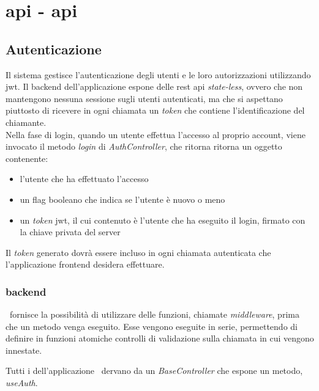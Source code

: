 \chapter{\acrshort{api} - \acrlong{api}}

\section{Autenticazione}
\label{chap:api}

Il sistema gestisce l'autenticazione degli utenti e le loro autorizzazioni utilizzando \gls{jwt}. Il \gls{backend} dell'applicazione espone delle \acrshort{rest} \acrshort{api} \textit{state-less}, ovvero che non mantengono nessuna sessione sugli utenti autenticati, ma che si aspettano piuttosto di ricevere in ogni chiamata un \textit{token} che contiene l'identificazione del chiamante. \\

\noindent
Nella fase di login, quando un utente effettua l'accesso al proprio account, viene invocato il metodo \textit{login} di \textit{AuthController}, che ritorna ritorna un oggetto contenente:
\begin{itemize}[itemsep=0pt]
	\item l'utente che ha effettuato l'accesso
	\item un flag booleano che indica se l'utente è nuovo o meno
	\item un \textit{token} \acrshort{jwt}, il cui contenuto è l'utente che ha eseguito il login, firmato con la chiave privata del server
\end{itemize}

\noindent 
Il \textit{token} generato dovrà essere incluso in ogni chiamata autenticata che l'applicazione \gls{frontend} desidera effettuare.

\subsection{\Gls{backend}}

\expressjs~fornisce la possibilità di utilizzare delle funzioni, chiamate \textit{middleware}, prima che un metodo venga eseguito. Esse vengono eseguite in serie, permettendo di definire in funzioni atomiche controlli di validazione sulla chiamata in cui vengono innestate.

Tutti i \textit{} dell'applicazione \nodejs~dervano da un \textit{BaseController} che espone un metodo, \textit{useAuth}.

